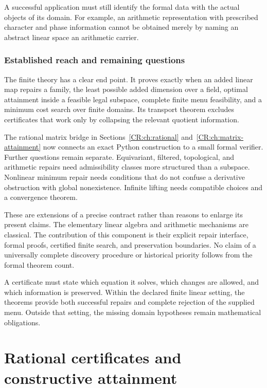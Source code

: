 A successful application must still identify the formal data with the actual objects of its domain. For example, an arithmetic representation with prescribed character and phase information cannot be obtained merely by naming an abstract linear space an arithmetic carrier.

\subsection{Established reach and remaining questions}
The finite theory has a clear end point. It proves exactly when an added linear map repairs a family, the least possible added dimension over a field, optimal attainment inside a feasible legal subspace, complete finite menu feasibility, and a minimum cost search over finite domains. Its transport theorem excludes certificates that work only by collapsing the relevant quotient information.

The rational matrix bridge in Sections~\ref{CR:ch:rational} and~\ref{CR:ch:matrix-attainment} now connects an exact Python construction to a small formal verifier. Further questions remain separate. Equivariant, filtered, topological, and arithmetic repairs need admissibility classes more structured than a subspace. Nonlinear minimum repair needs conditions that do not confuse a derivative obstruction with global nonexistence. Infinite lifting needs compatible choices and a convergence theorem.

These are extensions of a precise contract rather than reasons to enlarge its present claims. The elementary linear algebra and arithmetic mechanisms are classical. The contribution of this component is their explicit repair interface, formal proofs, certified finite search, and preservation boundaries. No claim of a universally complete discovery procedure or historical priority follows from the formal theorem count.

\begin{scopebox}[title=A usable stopping point]
A certificate must state which equation it solves, which changes are allowed, and which information is preserved. Within the declared finite linear setting, the theorems provide both successful repairs and complete rejection of the supplied menu. Outside that setting, the missing domain hypotheses remain mathematical obligations.
\end{scopebox}


\chapter{Rational certificates and constructive attainment}\label{CR:book:chapter-57}
